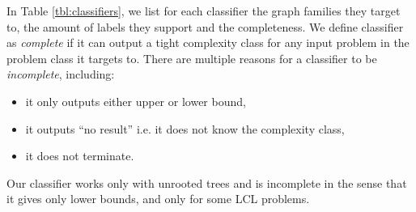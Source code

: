 In Table \ref{tbl:classifiers}, we list for each classifier the graph families they target to, the amount of labels they support and the completeness.
We define classifier as \emph{complete} if it can output a tight complexity class for any input problem in the problem class it targets to.
There are multiple reasons for a classifier to be \emph{incomplete}, including:
\begin{itemize}
    \item it only outputs either upper or lower bound,
    \item it outputs ``no result'' i.e. it does not know the complexity class,
    \item it does not terminate.
\end{itemize}
Our classifier works only with unrooted trees and is incomplete in the sense that it gives only lower bounds, and only for some LCL problems.
